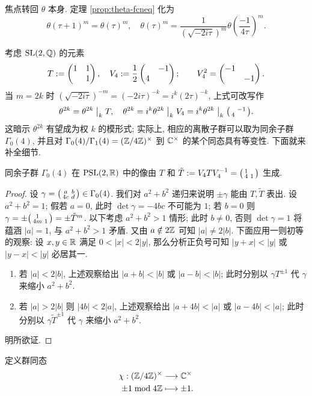 焦点转回 $\theta$ 本身. 定理 \ref{prop:theta-fcneq} 化为
\[ \theta(\tau + 1)^m = \theta(\tau)^m, \quad \theta\left( \tau \right)^m = \dfrac{1}{\left(\sqrt{-2i\tau}\right)^m} \theta\left( \dfrac{-1}{4\tau} \right)^m. \]

考虑 $\operatorname{SL}(2,\mathbb{Q})$ 的元素
\[ T := \begin{pmatrix} 1 & 1 \\  & 1 \end{pmatrix}, \quad V_4 := \frac{1}{2} \begin{pmatrix}  & -1 \\ 4 &  \end{pmatrix}; \qquad  V_4^2 = \begin{pmatrix} -1 &  \\  & -1 \end{pmatrix}. \]
当 $m = 2k$ 时 $(\sqrt{-2i\tau})^{-m} = (-2i\tau)^{-k} = i^k (2\tau)^{-k}$, 上式可改写作
\begin{equation}\label{eqn:theta-V4}
	\theta^{2k} = \theta^{2k} \;\big|_{k} \; T, \quad \theta^{2k} = i^k \theta^{2k} \;\big|_{k} \; V_4 = i^k \theta^{2k} \;\big|_{k} \; \bigl(\begin{smallmatrix}  & -1 \\ 4 &  \end{smallmatrix}\bigr).
\end{equation}
这暗示 $\theta^{2k}$ 有望成为权 $k$ 的模形式; 实际上, 相应的离散子群可以取为同余子群 $\Gamma_0(4)$, 并且对 $\Gamma_0(4)/\Gamma_1(4) = (\mathbb{Z}/4\mathbb{Z})^\times$ 到 $\mathbb{C}^\times$ 的某个同态具有等变性. 下面就来补全细节.

\begin{lemma}\label{prop:Gamma_0(4)-gen}
	同余子群 $\Gamma_0(4)$ 在 $\operatorname{PSL}(2,\mathbb{R})$ 中的像由 $T$ 和 $\tilde{T} := V_4 T V_4^{-1} = \bigl(\begin{smallmatrix} 1 &  \\ 4 & 1 \end{smallmatrix}\bigr)$ 生成.
\end{lemma}
\begin{proof}
	设 $\gamma = \bigl(\begin{smallmatrix} a & b \\ 4c & d \end{smallmatrix}\bigr) \in \Gamma_0(4)$. 我们对 $a^2 + b^2$ 递归来说明 $\pm\gamma$ 能由 $T, \tilde{T}$ 表出. 设 $a^2 + b^2 = 1$; 假若 $a=0$, 此时 $\det\gamma = -4bc$ 不可能为 $1$; 若 $b=0$ 则 $\gamma = \pm \bigl(\begin{smallmatrix} 1 &  \\ 4m & 1 \end{smallmatrix}\bigr) = \pm\tilde{T}^m$. 以下考虑 $a^2 + b^2 > 1$ 情形; 此时 $b \neq 0$, 否则 $\det\gamma = 1$ 将蕴涵 $|a|=1$, 与 $a^2 + b^2 > 1$ 矛盾. 又由 $a \notin 2\mathbb{Z}$ 可知 $|a| \neq 2|b|$. 下面应用一则初等的观察: 设 $x,y \in \mathbb{R}$ 满足 $0 < |x| < 2|y|$, 那么分析正负号可知 $|y+x| < |y|$ 或 $|y-x| < |y|$ 必居其一.
	\begin{enumerate}
		\item 若 $|a| < 2|b|$, 上述观察给出 $|a+b| < |b|$ 或 $|a-b| < |b|$; 此时分别以 $\gamma T^{\pm 1}$ 代 $\gamma$ 来缩小 $a^2 + b^2$.
		\item 若 $|a| > 2|b|$ 则 $|4b| < 2|a|$, 上述观察给出 $|a+4b| < |a|$ 或 $|a-4b| < |a|$; 此时分别以 $\gamma \tilde{T}^{\pm 1}$ 代 $\gamma$ 来缩小 $a^2 + b^2$.
	\end{enumerate}
	明所欲证.
\end{proof}

定义群同态
\begin{align*}
	\chi: (\mathbb{Z}/4\mathbb{Z})^\times & \longrightarrow \mathbb{C}^\times \\
	\pm 1 \bmod 4\mathbb{Z} & \longmapsto \pm 1.
\end{align*}

